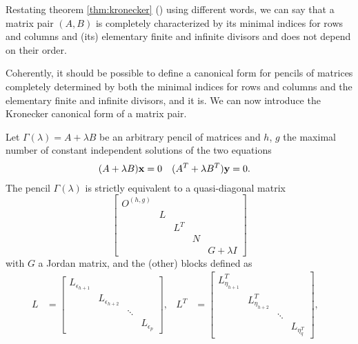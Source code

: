 \begin{remark}
    Restating theorem \ref{thm:kronecker} () using different words, we can say that a matrix pair
    \((A, B)\) is completely characterized by its minimal indices for rows and columns and (its) elementary finite and
    infinite divisors and does not depend on their order.
\end{remark}

Coherently, it should be possible to define a canonical form for pencils of matrices completely determined by both
the minimal indices for rows and columns and the elementary finite and infinite divisors, and it is. We can now introduce
the Kronecker canonical form of a matrix pair.

\begin{theorem}\label{thm:kcf}
    Let \(\Gamma(\lambda) = A + \lambda B\) be an arbitrary pencil of matrices and \(h\), \(g\) the maximal number of constant
    independent solutions of the two equations
    \begin{align*}
        (A + \lambda B)\vb{x} &= 0 & (A^T + \lambda B^T)\vb{y} &= 0.
    \end{align*}
    The pencil \(\Gamma(\lambda)\) is strictly equivalent to a quasi-diagonal matrix
    \[
        \begin{bmatrix}
            O^{(h, g)} \\
            & L \\
            & & L^T \\
            & & & N \\
            & & & & G + \lambda I
        \end{bmatrix}
    \]
    with \(G\) a Jordan matrix, and the (other) blocks defined as
    \begin{align*}
        L &= \begin{bmatrix}
            L_{\epsilon_{h+1}} \\
            & L_{\epsilon_{h+2}} \\
            & & \ddots \\
            & & & L_{\epsilon_{p}}
        \end{bmatrix}, &
        L^T &= \begin{bmatrix}
            L_{\eta_{h+1}}^T \\
            & L_{\eta_{h+2}}^T \\
            & & \ddots \\
            & & & L_{\eta_{q}^T}
        \end{bmatrix}, &\\

\end{align*}
\end{theorem}
